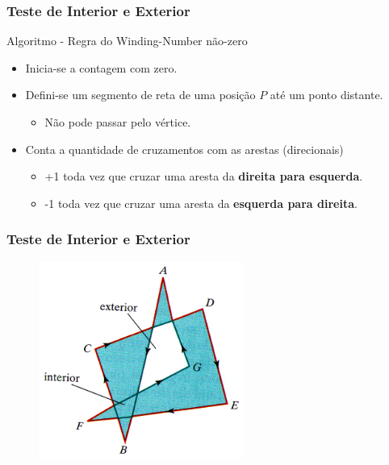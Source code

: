 \documentclass{beamer}
\begin{document}
\begin{frame}
\frametitle{Teste de Interior e Exterior}

		\begin{block}{Algoritmo - Regra do Winding-Number não-zero}
		\begin{itemize}
			\item<1-> Inicia-se a contagem com zero.
			\item<2-> Defini-se um segmento de reta de uma posição $P$ até um ponto distante.
				\begin{itemize}
					\item Não pode passar pelo vértice.
				\end{itemize}
			\item<3-> Conta a quantidade de cruzamentos com as arestas (direcionais)
				\begin{itemize}
					\item +1 toda vez que cruzar uma aresta da \textbf{direita para esquerda}.
					\item -1 toda vez que cruzar uma aresta da \textbf{esquerda para direita}.
				\end{itemize}
		\end{itemize}
		\end{block}
	
\end{frame}

\begin{frame}
\frametitle{Teste de Interior e Exterior}

		\begin{figure}[!h]
			\begin{center}
				\includegraphics[width=0.6\textwidth]{Figures/WinNum}
			\end{center}
		\end{figure}
	
\end{frame}
\end{document}
